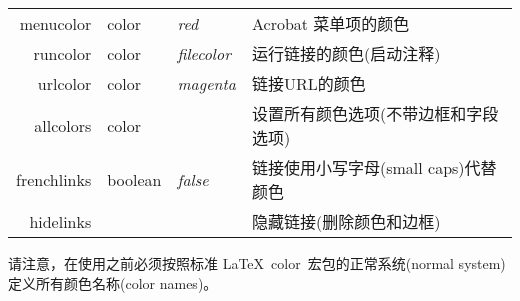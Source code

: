 \documentclass{article}
\newcommand*{\xpackage}[1]{\textsf{#1}}
\begin{document}
\begin{longtable}{@{}>{\ttfamily}rl>{\itshape}lp{8cm}@{}}
    menucolor      & color         & red        & Acrobat 菜单项的颜色                                                                                                                                                                                                        \\
    runcolor       & color         & filecolor  & 运行链接的颜色(启动注释)                                                                                                                                                                                                         \\
    urlcolor       & color         & magenta    & 链接URL的颜色                                                                                                                                                                                                              \\
    allcolors      & color         &            & 设置所有颜色选项(不带边框和字段选项)                                                                                                                                                                                                   \\
    frenchlinks    & boolean       & false      & 链接使用小写字母(small caps)代替颜色                                                                                                                                                                                              \\
    hidelinks      &               &            & 隐藏链接(删除颜色和边框)                                                                                                                                                                                                         \\
\end{longtable} \smallskip

请注意，在使用之前必须按照标准 \LaTeX\ \xpackage{color}\ 宏包的正常系统(normal system)定义所有颜色名称(color names)。
\end{document}
